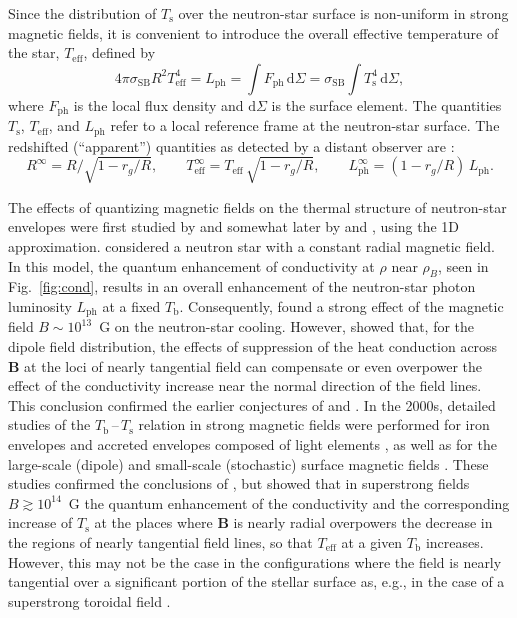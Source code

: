 \documentclass[smallextended]{svjour3}       %
\newcommand{\beq}{\begin{equation}}
\newcommand{\eeq}{\end{equation}}
\newcommand{\sSB}{\sigma_\mathrm{SB}}
\newcommand{\TbTs}{$T_\mathrm{b}$\,--\,$T_\mathrm{s}$}
\newcommand{\Teff}{T_\mathrm{eff}}
\newcommand{\Ts}{T_\mathrm{s}}
\begin{document}
Since the distribution of $\Ts$ over the neutron-star surface is
non-uniform in strong magnetic fields, it is convenient to
introduce the overall effective temperature of the star,
$\Teff$, defined by
\beq
   4 \pi \sSB R^2 \Teff^4 =
   L_\mathrm{ph}= 
 \int F_\mathrm{ph} \,\mathrm{d}\Sigma =
\sSB \int \Ts^4 \,\mathrm{d}\Sigma ,
\label{L}
\eeq
where $F_\mathrm{ph}$ is the local flux density and
 $\mathrm{d}\Sigma$ is the surface element.
The quantities $\Ts$, $\Teff$, and $L_\mathrm{ph}$
refer to a local reference frame at the neutron-star surface.
The redshifted (``apparent'') quantities
as detected by a distant observer are \citep{Thorne77}:
\beq
R^\infty = R / \sqrt{1-r_g/R},
\qquad
\Teff^\infty = \Teff \, \sqrt{1-r_g/R},
\qquad
L_\mathrm{ph}^\infty = (1-r_g/R)\, L_\mathrm{ph}.
\eeq

The effects of quantizing magnetic fields on the thermal
structure of neutron-star envelopes were first studied by
\citet{Hernquist85} and somewhat later by \citet{VanRiper88}
and \citet{Schaaf90}, using the 1D approximation.
\citet{VanRiper88} considered a neutron star with a constant
radial magnetic field. In this model, the quantum
enhancement of conductivity at $\rho$ near $\rho_B$, seen in
Fig.~\ref{fig:cond}, results
in an overall enhancement of the neutron-star photon
luminosity $L_\mathrm{ph}$ at a fixed $T_\mathrm{b}$.
Consequently, \citet{VanRiper91} found a strong effect of
the magnetic field $B\sim10^{13}$~G on the neutron-star
cooling. However, \citet{ShibanovYakovlev96} showed that, for
the dipole field distribution, the effects of suppression of
the heat conduction across $\bm{B}$ at the loci of nearly
tangential field can compensate or even overpower the effect
of the conductivity increase near the   normal direction of
the field lines. This conclusion confirmed the earlier conjectures  of
\citet{Hernquist85} and \citet{Schaaf90}. In the 2000s,
detailed studies of the \TbTs{} relation in strong magnetic
fields were performed for iron envelopes \citep{PY01} and
accreted envelopes composed of light elements
\citep{Potekhin-ea03}, as well as for the large-scale
(dipole) and small-scale (stochastic) surface magnetic
fields \citep{PUC05}. These studies confirmed the conclusions
of \citet{ShibanovYakovlev96}, but showed that in
superstrong fields $B\gtrsim10^{14}$~G the quantum
enhancement of the conductivity and the corresponding
increase of $\Ts$ at the places where
$\bm{B}$ is nearly radial overpowers the
decrease in the regions of nearly tangential field lines, so
that $\Teff$ at a given $T_\mathrm{b}$ increases. However,
this may not be the case in the configurations where
the field is nearly tangential over a significant portion of
the stellar surface as, e.g., in the case of a superstrong
toroidal field \citep{PerezAMP06,PageGK07}.
\end{document}
